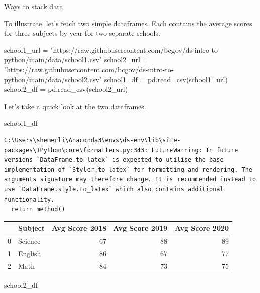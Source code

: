 \documentclass[
  letterpaper,
  DIV=11,
  numbers=noendperiod]{scrreprt}
\newenvironment{Shaded}{\begin{snugshade}}{\end{snugshade}}
\newcommand{\NormalTok}[1]{\textcolor[rgb]{0.00,0.23,0.31}{#1}}
\newcommand{\OperatorTok}[1]{\textcolor[rgb]{0.37,0.37,0.37}{#1}}
\newcommand{\StringTok}[1]{\textcolor[rgb]{0.13,0.47,0.30}{#1}}
\begin{document}
Ways to stack data

To illustrate, let's fetch two simple dataframes. Each contains the
average scores for three subjects by year for two separate schools.

\begin{Shaded}
\begin{Highlighting}[]
\NormalTok{school1\_url  }\OperatorTok{=} \StringTok{"https://raw.githubusercontent.com/bcgov/ds{-}intro{-}to{-}python/main/data/school1.csv"}
\NormalTok{school2\_url  }\OperatorTok{=} \StringTok{"https://raw.githubusercontent.com/bcgov/ds{-}intro{-}to{-}python/main/data/school2.csv"}
\NormalTok{school1\_df }\OperatorTok{=}\NormalTok{ pd.read\_csv(school1\_url)}
\NormalTok{school2\_df }\OperatorTok{=}\NormalTok{ pd.read\_csv(school2\_url)}
\end{Highlighting}
\end{Shaded}

Let's take a quick look at the two dataframes.

\begin{Shaded}
\begin{Highlighting}[]
\NormalTok{school1\_df}
\end{Highlighting}
\end{Shaded}

\begin{verbatim}
C:\Users\shemerli\Anaconda3\envs\ds-env\lib\site-packages\IPython\core\formatters.py:343: FutureWarning: In future versions `DataFrame.to_latex` is expected to utilise the base implementation of `Styler.to_latex` for formatting and rendering. The arguments signature may therefore change. It is recommended instead to use `DataFrame.style.to_latex` which also contains additional functionality.
  return method()
\end{verbatim}

\begin{tabular}{llrrr}
\toprule
{} &  Subject &  Avg Score 2018 &  Avg Score 2019 &  Avg Score 2020 \\
\midrule
0 &  Science &              67 &              88 &              89 \\
1 &  English &              86 &              67 &              77 \\
2 &     Math &              84 &              73 &              75 \\
\bottomrule
\end{tabular}

\begin{Shaded}
\begin{Highlighting}[]
\NormalTok{school2\_df}
\end{Highlighting}
\end{Shaded}
\end{document}
